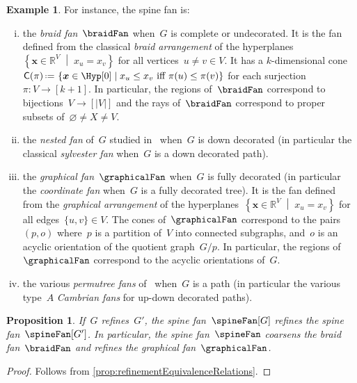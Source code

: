 \documentclass{amsart}
\newtheorem{proposition}[theorem]{Proposition}
\theoremstyle{definition}
\newtheorem{example}[theorem]{Example}
\newcommand{\R}{\mathbb{R}} %
\renewcommand{\b}[1]{{\boldsymbol{#1}}} %
\newcommand{\set}[2]{\left\{ #1 \;\middle|\; #2 \right\}} %
\newcommand{\eqdef}{\mbox{\,\raisebox{0.2ex}{\scriptsize\ensuremath{\mathrm:}}\ensuremath{=}\,}} %
\newcommand{\darkblue}{\color{darkblue}} %
\newcommand{\defn}[1]{\textsl{\darkblue #1}} %
\newcommand{\vertexSet}{V}
\newcommand{\normalCone}{\mathsf{C}} %
\begin{document}
\begin{example}
  \label{exm:spineFans}
  For instance, the spine fan is:
  \begin{enumerate}[(i)]
    \item the \defn{braid fan}~$\braidFan$ when~$G$ is complete or undecorated. It is the fan defined from the classical \defn{braid arrangement} of the hyperplanes~$\set{\b{x} \in \R^{\vertexSet}}{x_u = x_v}$ for all vertices~$u \ne v \in \vertexSet$. It has a $k$-dimensional cone~$\normalCone(\pi) \eqdef \set{\b{x} \in \Hyp[0]}{x_u \le x_v \text{ iff } \pi(u) \le \pi(v)}$ for each surjection~$\pi : \vertexSet \to [k+1]$. In particular, the regions of~$\braidFan$ correspond to bijections~${\vertexSet \to [|\vertexSet|]}$ and the rays of~$\braidFan$ correspond to proper subsets of~$\varnothing \ne X \ne \vertexSet$.
    \item the \defn{nested fan} of~$G$ studied in~\cite{CarrDevadoss, Zelevinsky} when~$G$ is down decorated (in particular the classical \defn{sylvester fan} when~$G$ is a down decorated path).
    \item the \defn{graphical fan}~$\graphicalFan$ when~$G$ is fully decorated (in particular the \defn{coordinate fan} when~$G$ is a fully decorated tree). It is the fan defined from the \defn{graphical arrangement} of the hyperplanes~$\set{\b{x} \in \R^{\vertexSet}}{x_u = x_v}$ for all edges~$\{u, v\} \in \vertexSet$. The cones of~$\graphicalFan$ correspond to the pairs~$(p,o)$ where~$p$ is a partition of~$\vertexSet$ into connected subgraphs, and~$o$ is an acyclic orientation of the quotient graph~$G/p$. In particular, the regions of~$\graphicalFan$ correspond to the acyclic orientations of~$G$.
    \item the various \defn{permutree fans} of~\cite{PilaudPons-permutrees} when~$G$ is a path (in particular the various type~$A$ \defn{Cambrian fans} for up-down decorated paths).
  \end{enumerate}
\end{example}

\begin{proposition}
  \label{prop:refinementSpineFan}
  If~$G$ refines~$G'$, the spine fan~$\spineFan[G]$ refines the spine fan~$\spineFan[G']$.
  In particular, the spine fan~$\spineFan$ coarsens the braid fan~$\braidFan$ and refines the graphical fan~$\graphicalFan$.
\end{proposition}

\begin{proof}
  Follows from \cref{prop:refinementEquivalenceRelations}.
\end{proof}
\end{document}
